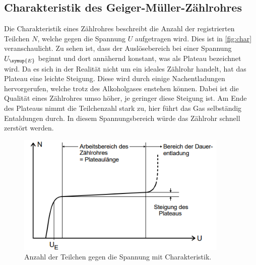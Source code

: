 \subsection{Charakteristik des Geiger-Müller-Zählrohres}
Die Charakteristik eines Zählrohres beschreibt die Anzahl der registrierten Teilchen $N$, welche gegen die Spannung $U$ aufgetragen wird.
Dies ist in \autoref{fig:char} veranschaulicht. Zu sehen ist, dass der Auslösebereich bei einer Spannung $U_{\symup{E}}$ beginnt und dort
annähernd konstant, was als Plateau bezeichnet wird. Da es sich in der Realität nicht um ein ideales Zählrohr handelt, hat das Plateau
eine leichte Steigung. Diese wird durch einige Nachentladungen hervorgerufen, welche trotz des Alkoholgases enstehen können. Dabei
ist die Qualität eines Zählrohres umso höher, je geringer diese Steigung ist. Am Ende des Plateaus nimmt die Teilchenzahl stark zu, hier
führt das Gas selbständig Entaldungen durch.
In diesem Spannungsbereich würde das Zählrohr schnell zerstört werden.
\begin{figure}
    \centering
    \includegraphics[width=0.9\textwidth]{content/charakteristik.png}
    \caption{Anzahl der Teilchen gegen die Spannung mit Charakteristik.}
    \label{fig:char}
\end{figure}
